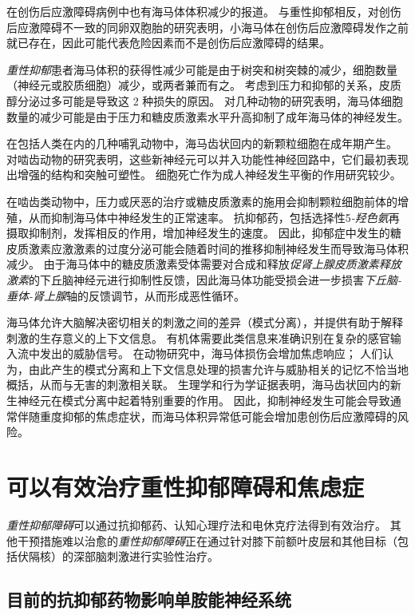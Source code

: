 在创伤后应激障碍病例中也有海马体体积减少的报道。
与重性抑郁相反，对创伤后应激障碍不一致的同卵双胞胎的研究表明，小海马体在创伤后应激障碍发作之前就已存在，因此可能代表危险因素而不是创伤后应激障碍的结果。


\textit{重性抑郁}患者海马体积的获得性减少可能是由于树突和树突棘的减少，细胞数量（神经元或胶质细胞）减少，或两者兼而有之。
考虑到压力和抑郁的关系，皮质醇分泌过多可能是导致这 2 种损失的原因。
对几种动物的研究表明，海马体细胞数量的减少可能是由于压力和糖皮质激素水平升高抑制了成年海马体的神经发生。


在包括人类在内的几种哺乳动物中，海马齿状回内的新颗粒细胞在成年期产生。
对啮齿动物的研究表明，这些新神经元可以并入功能性神经回路中，它们最初表现出增强的结构和突触可塑性。
细胞死亡作为成人神经发生平衡的作用研究较少。


在啮齿类动物中，压力或厌恶的治疗或糖皮质激素的施用会抑制颗粒细胞前体的增殖，从而抑制海马体中神经发生的正常速率。
抗抑郁药，包括选择性5\textit{-羟色氨}再摄取抑制剂，发挥相反的作用，增加神经发生的速度。
因此，抑郁症中发生的糖皮质激素应激激素的过度分泌可能会随着时间的推移抑制神经发生而导致海马体积减少。
由于海马体中的糖皮质激素受体需要对合成和释放\textit{促肾上腺皮质激素释放激素}的下丘脑神经元进行抑制性反馈，因此海马体功能受损会进一步损害\textit{下丘脑-垂体-肾上腺}轴的反馈调节，从而形成恶性循环。


海马体允许大脑解决密切相关的刺激之间的差异（模式分离），并提供有助于解释刺激的生存意义的上下文信息。
有机体需要此类信息来准确识别在复杂的感官输入流中发出的威胁信号。
在动物研究中，海马体损伤会增加焦虑响应；
人们认为，由此产生的模式分离和上下文信息处理的损害允许与威胁相关的记忆不恰当地概括，从而与无害的刺激相关联。
生理学和行为学证据表明，海马齿状回内的新生神经元在模式分离中起着特别重要的作用。
因此，抑制神经发生可能会导致通常伴随重度抑郁的焦虑症状，而海马体积异常低可能会增加患创伤后应激障碍的风险。



\section{可以有效治疗重性抑郁障碍和焦虑症}

\textit{重性抑郁障碍}可以通过抗抑郁药、认知心理疗法和电休克疗法得到有效治疗。
其他干预措施难以治愈的\textit{重性抑郁障碍}正在通过针对膝下前额叶皮层和其他目标（包括伏隔核）的深部脑刺激进行实验性治疗。



\subsection{目前的抗抑郁药物影响单胺能神经系统}


